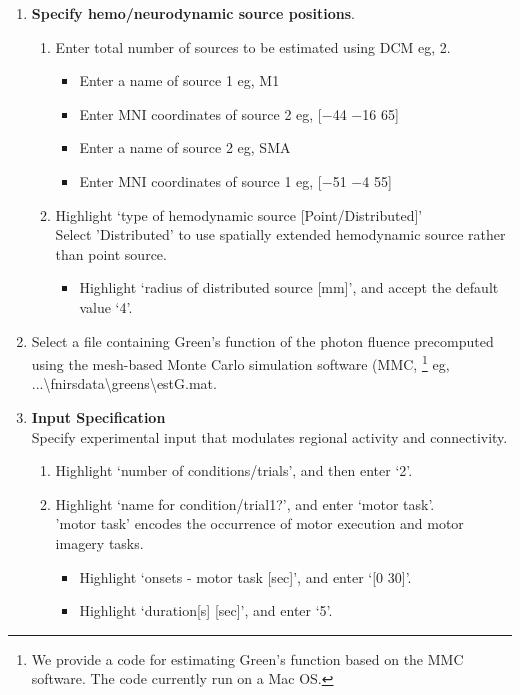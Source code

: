 \begin{enumerate}
\item \textbf{Specify hemo/neurodynamic source positions}.
\begin{enumerate}
\item Enter total number of sources to be estimated using DCM eg, 2. 
\begin{itemize}
\item Enter a name of source 1 eg, M1
\item Enter MNI coordinates of source 2 eg, [$-$44 $-$16 65]
\item Enter a name of source 2 eg, SMA
\item Enter MNI coordinates of source 1 eg, [$-$51 $-$4 55]
\end{itemize}
\item Highlight `type of hemodynamic source [Point/Distributed]' \\Select 'Distributed' to use spatially extended hemodynamic source rather than point source. 
\begin{itemize}
\item Highlight `radius of distributed source [mm]', and accept the default value `4'. 
\end{itemize}
\end{enumerate}
\item Select a file containing Green's function of the photon fluence precomputed using the mesh-based Monte Carlo simulation software (MMC, \citep{fang2010mesh}\footnote{We provide a code for estimating Green's function based on the MMC software. The code currently run on a Mac OS.} eg, ...\textbackslash fnirs\textunderscore data\textbackslash greens\textbackslash est\textunderscore G.mat.
\item \textbf{Input Specification}
\\Specify experimental input that modulates regional activity and connectivity. 
\begin{enumerate}
\item Highlight `number of conditions/trials', and then enter `2'. 
\item Highlight `name for condition/trial1?', and enter `motor task'. \\'motor task' encodes the occurrence of motor execution and motor imagery tasks. 
\begin{itemize}
\item Highlight `onsets - motor task [sec]', and enter `[0 30]'. 
\item Highlight `duration[s] [sec]', and enter `5'. 
\end{itemize}

\end{enumerate}
\end{enumerate}
